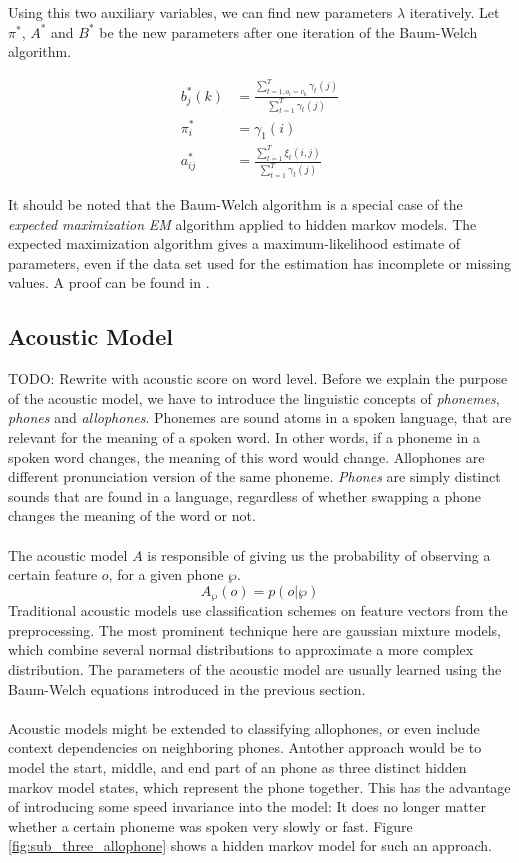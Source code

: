 Using this two auxiliary variables, we can find new parameters $\lambda$ iteratively. Let $\pi^*$, $A^*$ and $B^*$ be the new parameters after one iteration of the Baum-Welch algorithm. 

\begin{align*}
b^*_j(k) &= \frac{\sum_{t = 1, o_t = v_k}^{T} \gamma_t(j)}{\sum_{t = 1}^{T} \gamma_t(j)} \\
\pi^*_i &= \gamma_1(i) \\
a_{ij}^*  &= \frac{\sum_{t = 1}^{T} \xi_t(i, j)}{\sum_{t = 1}^{T} \gamma_t(j)} 
\end{align*}

It should be noted that the Baum-Welch algorithm is a special case of the \textit{expected maximization} {\textit{EM}} algorithm applied to hidden markov models. The expected maximization algorithm gives a maximum-likelihood estimate of parameters, even if the data set used for the estimation has incomplete or missing values. A proof can be found in \cite{bilmes1998gentle}. 

\subsection{Acoustic Model}
\label{sec:acoustic_model}
TODO: Rewrite with acoustic score on word level. 
Before we explain the purpose of the acoustic model, we have to introduce the linguistic concepts of \textit{phonemes}, \textit{phones} and \textit{allophones}. Phonemes are sound atoms in a spoken language, that are relevant for the meaning of a spoken word. In other words, if a phoneme in a spoken word changes, the meaning of this word would change. Allophones are different pronunciation version of the same phoneme. \textit{Phones} are simply distinct sounds that are found in a language, regardless of whether swapping a phone changes the meaning of the word or not. \\ \\
The acoustic model $A$ is responsible of giving us the probability of observing a certain feature $o$, for a given phone $\wp$. 
\[
	A_\wp(o) = p(o|\wp)
\]
Traditional acoustic models use classification schemes on feature vectors from the preprocessing. The most prominent technique here are gaussian mixture models, which combine several normal distributions to approximate a more complex distribution. The parameters of the acoustic model are usually learned using the Baum-Welch equations introduced in the previous section. \\ \\
Acoustic models might be extended to classifying allophones, or even include context dependencies on neighboring phones. Antother approach would be to model the start, middle, and end part of an phone as three distinct hidden markov model states, which represent the phone together. This has the advantage of introducing some speed invariance into the model: It does no longer matter whether a certain phoneme was spoken very slowly or fast. Figure \ref{fig:sub_three_allophone} shows a hidden markov model for such an approach. 

